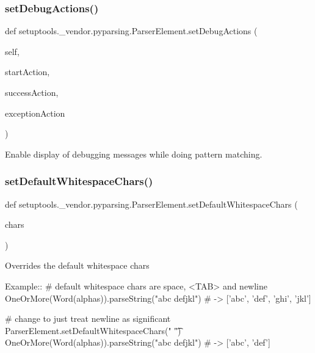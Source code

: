 \subsubsection{\texorpdfstring{set\+Debug\+Actions()}{setDebugActions()}}
{\footnotesize\ttfamily def setuptools.\+\_\+vendor.\+pyparsing.\+Parser\+Element.\+set\+Debug\+Actions (\begin{DoxyParamCaption}\item[{}]{self,  }\item[{}]{start\+Action,  }\item[{}]{success\+Action,  }\item[{}]{exception\+Action }\end{DoxyParamCaption})}

\begin{DoxyVerb}Enable display of debugging messages while doing pattern matching.
\end{DoxyVerb}
 \mbox{\label{classsetuptools_1_1__vendor_1_1pyparsing_1_1_parser_element_ace898842e0db5a5e509c8842426aab45}} 
\subsubsection{\texorpdfstring{set\+Default\+Whitespace\+Chars()}{setDefaultWhitespaceChars()}}
{\footnotesize\ttfamily def setuptools.\+\_\+vendor.\+pyparsing.\+Parser\+Element.\+set\+Default\+Whitespace\+Chars (\begin{DoxyParamCaption}\item[{}]{chars }\end{DoxyParamCaption})\hspace{0.3cm}{\ttfamily [static]}}

\begin{DoxyVerb}Overrides the default whitespace chars

Example::
    # default whitespace chars are space, <TAB> and newline
    OneOrMore(Word(alphas)).parseString("abc def\nghi jkl")  # -> ['abc', 'def', 'ghi', 'jkl']
    
    # change to just treat newline as significant
    ParserElement.setDefaultWhitespaceChars(" \t")
    OneOrMore(Word(alphas)).parseString("abc def\nghi jkl")  # -> ['abc', 'def']
\end{DoxyVerb}
 \mbox{\label{classsetuptools_1_1__vendor_1_1pyparsing_1_1_parser_element_a44066b87aa19c3aaa008d0a7bda1cc6d}} 
